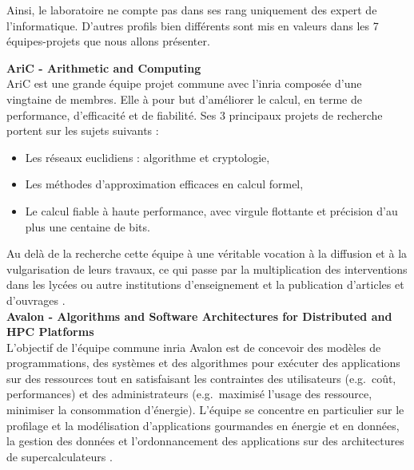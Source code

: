 Ainsi, le laboratoire ne compte pas dans ses rang uniquement des expert de l'informatique. D'autres profils bien différents sont mis en valeurs dans les 7 équipes-projets que nous allons présenter.
\newpage

\textbf{AriC - Arithmetic and Computing}\\
AriC est une grande équipe projet commune avec l'\gls{inria} composée d'une vingtaine de membres. Elle à pour but d'améliorer le calcul, en terme de performance, d'efficacité et de fiabilité. Ses 3 principaux projets de recherche portent sur les sujets suivants :
\begin{itemize}
	\item Les réseaux euclidiens : algorithme et cryptologie,
	\item Les méthodes d'approximation efficaces en calcul formel,
	\item Le calcul fiable à haute performance, avec virgule flottante et précision d'au plus une centaine de bits.
\end{itemize}
Au delà de la recherche cette équipe à une véritable vocation à la diffusion et à la vulgarisation de leurs travaux, ce qui passe par la multiplication des interventions dans les lycées ou autre institutions d'enseignement et la publication d'articles et d'ouvrages \cite{aric}.\\

\textbf{Avalon - Algorithms and Software Architectures for Distributed and HPC Platforms}\\
L'objectif de l'équipe commune \gls{inria} Avalon est de concevoir des modèles de programmations, des systèmes et des algorithmes pour exécuter des applications sur des ressources tout en satisfaisant les contraintes des utilisateurs (e.g.\ coût, performances) et des administrateurs (e.g.\ maximisé l'usage des ressource, minimiser la consommation d'énergie).
L'équipe se concentre en particulier sur le profilage et la modélisation d'applications gourmandes en énergie et en données, la gestion des données et l'ordonnancement des applications sur des architectures de supercalculateurs \cite{avalon}.\\


